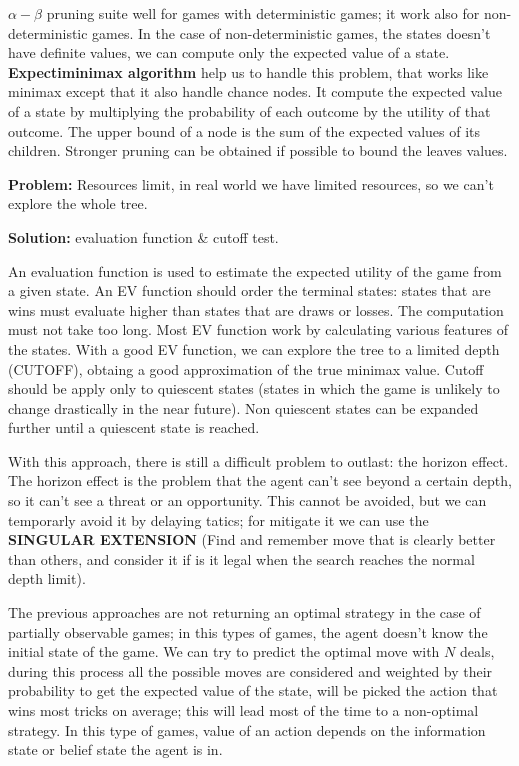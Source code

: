 \documentclass[12pt]{article}
\begin{document}
\begin{enumerate}[label=\textbf{AS.\arabic*}]
    $\alpha - \beta$ pruning suite well for games with deterministic games; it work also for non-deterministic games.
    In the case of non-deterministic games, the states doesn't have definite values, we can compute only the expected value of a state.
    \textbf{Expectiminimax algorithm} help us to handle this problem, that works like minimax 
    except that it also handle chance nodes.
    It compute the expected value of a state by multiplying the probability of each outcome by the utility of that outcome.
    The upper bound of a node is the sum of the expected values of its children.
    Stronger pruning can be obtained if possible to bound the leaves values.

    \textbf{Problem:} Resources limit, in real world we have limited resources, so we can't explore the whole tree.
    
    \textbf{Solution:} evaluation function \& cutoff test.

    An evaluation function is used to estimate the expected utility of the game from a given state.
        An EV function should order the terminal states: 
        states that are wins must evaluate higher than states that are draws or losses.
        The computation must not take too long.
        Most EV function work by calculating various features of the states.
        With a good EV function, we can explore the tree to a limited depth (CUTOFF), obtaing a good approximation of the true minimax value.
        Cutoff should be apply only to quiescent states (states in which the game is unlikely to change drastically in the near future).
        Non quiescent states can be expanded further until a quiescent state is reached.
    
    With this approach, there is still a difficult problem to outlast: the horizon effect.
    The horizon effect is the problem that the agent can't see beyond a certain depth, so it can't see a threat or an opportunity.
    This cannot be avoided, but we can temporarly avoid it by delaying tatics; for mitigate it we can use the \textbf{SINGULAR EXTENSION} 
    (Find and remember move that is clearly better than others, and consider it if is it legal when the search reaches the normal depth limit).

    The previous approaches are not returning an optimal strategy in the case of partially observable games; in this types of games, 
    the agent doesn't know the initial state of the game.
    We can try to predict the optimal move with $N$ deals, during this process all the possible moves are considered and weighted by their probability 
    to get the expected value of the state, will be picked the action that wins most tricks on average;
    this will lead most of the time to a non-optimal strategy.
    In this type of games, value of an action depends on the information state or belief state the agent is in.


\end{enumerate}
\end{document}
